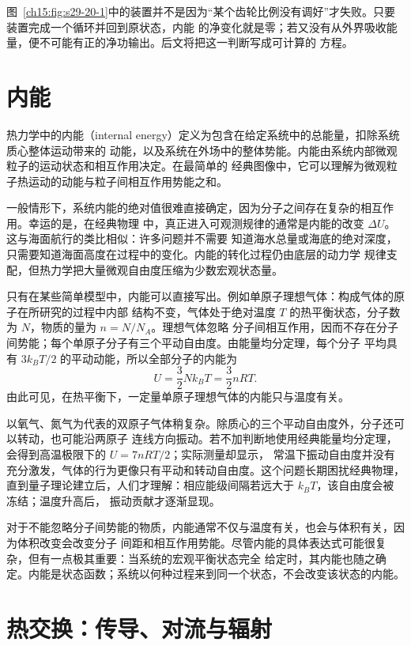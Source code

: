 {图~\ref{ch15:fig:s29-20-1}中的装置并不是因为“某个齿轮比例没有调好”才失败。只要装置完成一个循环并回到原状态，内能
的净变化就是零；若又没有从外界吸收能量，便不可能有正的净功输出。后文将把这一判断写成可计算的
方程。

\section{内能}

热力学中的内能（internal energy）定义为包含在给定系统中的总能量，扣除系统质心整体运动带来的
动能，以及系统在外场中的整体势能。内能由系统内部微观粒子的运动状态和相互作用决定。在最简单的
经典图像中，它可以理解为微观粒子热运动的动能与粒子间相互作用势能之和。

一般情形下，系统内能的绝对值很难直接确定，因为分子之间存在复杂的相互作用。幸运的是，在经典物理
中，真正进入可观测规律的通常是内能的改变 $\Delta U$。这与海面航行的类比相似：许多问题并不需要
知道海水总量或海底的绝对深度，只需要知道海面高度在过程中的变化。内能的转化过程仍由底层的动力学
规律支配，但热力学把大量微观自由度压缩为少数宏观状态量。

只有在某些简单模型中，内能可以直接写出。例如单原子理想气体：构成气体的原子在所研究的过程中内部
结构不变，气体处于绝对温度 $T$ 的热平衡状态，分子数为 $N$，物质的量为 $n=N/N_A$。理想气体忽略
分子间相互作用，因而不存在分子间势能；每个单原子分子有三个平动自由度。由能量均分定理，每个分子
平均具有 $3k_BT/2$ 的平动动能，所以全部分子的内能为
\begin{equation}
  \boxed{U=\frac32Nk_BT=\frac32nRT}. \label{ch15:eq:s29-20-1}
\end{equation}
由此可见，在热平衡下，一定量单原子理想气体的内能只与温度有关。

以氧气、氮气为代表的双原子气体稍复杂。除质心的三个平动自由度外，分子还可以转动，也可能沿两原子
连线方向振动。若不加判断地使用经典能量均分定理，会得到高温极限下的 $U=7nRT/2$；实际测量却显示，
常温下振动自由度并没有充分激发，气体的行为更像只有平动和转动自由度。这个问题长期困扰经典物理，
直到量子理论建立后，人们才理解：相应能级间隔若远大于 $k_BT$，该自由度会被冻结；温度升高后，
振动贡献才逐渐显现。

对于不能忽略分子间势能的物质，内能通常不仅与温度有关，也会与体积有关，因为体积改变会改变分子
间距和相互作用势能。尽管内能的具体表达式可能很复杂，但有一点极其重要：当系统的宏观平衡状态完全
给定时，其内能也随之确定。内能是状态函数；系统以何种过程来到同一个状态，不会改变该状态的内能。

\section{热交换：传导、对流与辐射}

}
